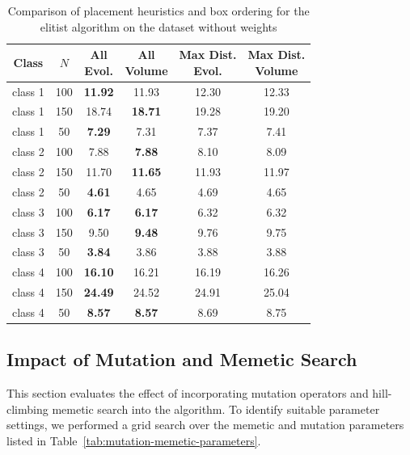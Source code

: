 \begin{table}[htbp]
\centering
\caption{Comparison of placement heuristics and box ordering for the elitist algorithm on the dataset without weights}
\label{tab:combined-results}
\begin{tabular}{|c|c|c|c|c|c|}
\hline 
Class & $N$ 
& \shortstack{All \\ Evol.} 
& \shortstack{All \\ Volume} 
& \shortstack{Max Dist. \\ Evol.} 
& \shortstack{Max Dist. \\ Volume} \\ \hline
class 1 & 100 & \textbf{11.92} & 11.93 & 12.30 & 12.33 \\ \hline
class 1 & 150 & 18.74 & \textbf{18.71} & 19.28 & 19.20 \\ \hline
class 1 & 50  & \textbf{7.29}  & 7.31  & 7.37  & 7.41  \\ \hline
class 2 & 100 & 7.88  & \textbf{7.88}  & 8.10  & 8.09  \\ \hline
class 2 & 150 & 11.70 & \textbf{11.65} & 11.93 & 11.97 \\ \hline
class 2 & 50  & \textbf{4.61}  & 4.65  & 4.69  & 4.65  \\ \hline
class 3 & 100 & \textbf{6.17}  & \textbf{6.17}  & 6.32  & 6.32  \\ \hline
class 3 & 150 & 9.50  & \textbf{9.48}  & 9.76  & 9.75  \\ \hline
class 3 & 50  & \textbf{3.84}  & 3.86  & 3.88  & 3.88  \\ \hline
class 4 & 100 & \textbf{16.10} & 16.21 & 16.19 & 16.26 \\ \hline
class 4 & 150 & \textbf{24.49} & 24.52 & 24.91 & 25.04 \\ \hline
class 4 & 50  & \textbf{8.57}  & \textbf{8.57}  & 8.69  & 8.75 \\ \hline
\end{tabular}
\end{table}


\subsection{Impact of Mutation and Memetic Search}
This section evaluates the effect of incorporating mutation operators and hill-climbing memetic 
search into the algorithm. To identify suitable parameter settings, we performed a grid search over 
the memetic and mutation parameters listed in Table~\ref{tab:mutation-memetic-parameters}. 

